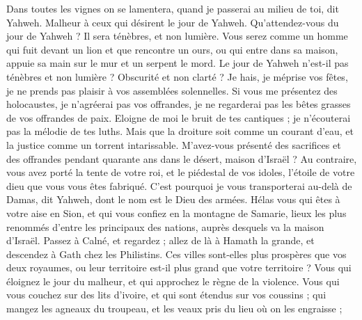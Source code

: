 \begin{multicols}{2}
Dans toutes les vignes on se lamentera, quand je passerai au milieu de toi, dit Yahweh.
Malheur à ceux qui désirent le jour de Yahweh. Qu’attendez-vous du jour de Yahweh ? Il sera ténèbres, et non lumière.
Vous serez comme un homme qui fuit devant un lion et que rencontre un ours, ou qui entre dans sa maison, appuie sa main sur le mur et un serpent le mord.
Le jour de Yahweh n’est-il pas ténèbres et non lumière ? Obscurité et non clarté ?
Je hais, je méprise vos fêtes, je ne prends pas plaisir à vos assemblées solennelles.
Si vous me présentez des holocaustes, je n’agréerai pas vos offrandes, je ne regarderai pas les bêtes grasses de vos offrandes de paix.
Eloigne de moi le bruit de tes cantiques ; je n’écouterai pas la mélodie de tes luths.
Mais que la droiture soit comme un courant d’eau, et la justice comme un torrent intarissable.
M’avez-vous présenté des sacrifices et des offrandes pendant quarante ans dans le désert, maison d'Israël ?
Au contraire, vous avez porté la tente de votre roi, et le piédestal de vos idoles, l'étoile de votre dieu que vous vous êtes fabriqué.
C'est pourquoi je vous transporterai au-delà de Damas, dit Yahweh, dont le nom est le Dieu des armées.
\VerseOne{}Hélas vous qui êtes à votre aise en Sion, et qui vous confiez en la montagne de Samarie, lieux les plus renommés d’entre les principaux des nations, auprès desquels va la maison d'Israël.
Passez à Calné, et regardez ; allez de là à Hamath la grande, et descendez à Gath chez les Philistins. Ces villes sont-elles plus prospères que vos deux royaumes, ou leur territoire est-il plus grand que votre territoire ?
Vous qui éloignez le jour du malheur, et qui approchez le règne de la violence.
Vous qui vous couchez sur des lits d'ivoire, et qui sont étendus sur vos coussins ; qui mangez les agneaux du troupeau, et les veaux pris du lieu où on les engraisse ;

\end{multicols}
